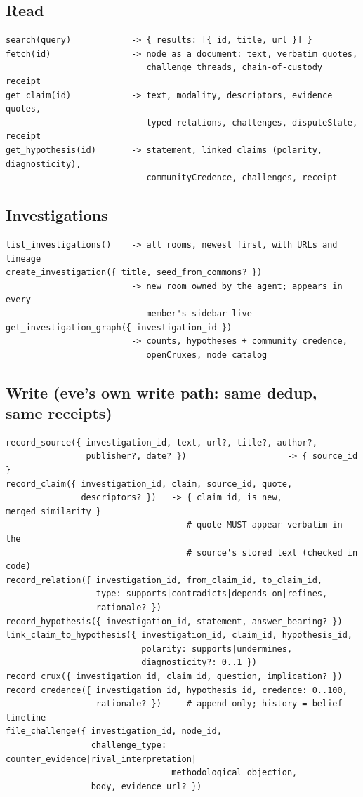 \documentclass[10pt,twocolumn]{article}
\begin{document}
\subsection*{Read}
\begin{lstlisting}
search(query)            -> { results: [{ id, title, url }] }
fetch(id)                -> node as a document: text, verbatim quotes,
                            challenge threads, chain-of-custody receipt
get_claim(id)            -> text, modality, descriptors, evidence quotes,
                            typed relations, challenges, disputeState, receipt
get_hypothesis(id)       -> statement, linked claims (polarity, diagnosticity),
                            communityCredence, challenges, receipt
\end{lstlisting}

\subsection*{Investigations}
\begin{lstlisting}
list_investigations()    -> all rooms, newest first, with URLs and lineage
create_investigation({ title, seed_from_commons? })
                         -> new room owned by the agent; appears in every
                            member's sidebar live
get_investigation_graph({ investigation_id })
                         -> counts, hypotheses + community credence,
                            openCruxes, node catalog
\end{lstlisting}

\subsection*{Write (eve's own write path: same dedup, same receipts)}
\begin{lstlisting}
record_source({ investigation_id, text, url?, title?, author?,
                publisher?, date? })                    -> { source_id }
record_claim({ investigation_id, claim, source_id, quote,
               descriptors? })   -> { claim_id, is_new, merged_similarity }
                                    # quote MUST appear verbatim in the
                                    # source's stored text (checked in code)
record_relation({ investigation_id, from_claim_id, to_claim_id,
                  type: supports|contradicts|depends_on|refines,
                  rationale? })
record_hypothesis({ investigation_id, statement, answer_bearing? })
link_claim_to_hypothesis({ investigation_id, claim_id, hypothesis_id,
                           polarity: supports|undermines,
                           diagnosticity?: 0..1 })
record_crux({ investigation_id, claim_id, question, implication? })
record_credence({ investigation_id, hypothesis_id, credence: 0..100,
                  rationale? })     # append-only; history = belief timeline
file_challenge({ investigation_id, node_id,
                 challenge_type: counter_evidence|rival_interpretation|
                                 methodological_objection,
                 body, evidence_url? })
\end{lstlisting}
\end{document}
